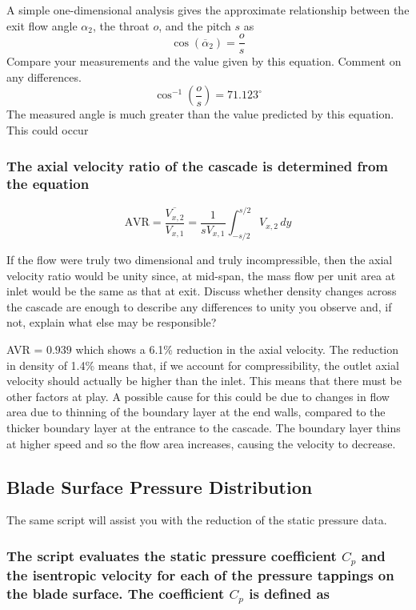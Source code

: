 \documentclass{article}
\begin{document}
A simple one-dimensional analysis gives the approximate relationship between the exit flow angle $\alpha_2$, the throat $o$, and the pitch $s$ as
\begin{equation}
    \cos (\overline{\alpha}_2) = \frac{o}{s}
\end{equation}
Compare your measurements and the value given by this equation. Comment on any
differences.
\begin{equation}
    \cos^{-1}\left( \frac{o}{s} \right) = 71.123^\circ
\end{equation}
The measured angle is much greater than the value predicted by this equation.
This could occur 

\subsubsection{The axial velocity ratio of the cascade is determined from the equation
}
\begin{equation}
    \text{AVR} = \frac{\overline{V_{x,2}}}{V_{x,1}} = \frac{1}{s V_{x,1}} \int_{-s/2}^{s/2} V_{x,2} \, dy
\end{equation}

If the flow were truly two dimensional and truly incompressible, then the axial velocity ratio
would be unity since, at mid-span, the mass flow per unit area at inlet would be the same as
that at exit. Discuss whether density changes across the cascade are enough to describe any
differences to unity you observe and, if not, explain what else may be responsible?

AVR = $0.939$ which shows a 6.1\% reduction in the axial velocity.
The reduction in density of 1.4\% means that, if we account for compressibility, the outlet axial velocity should actually be higher than the inlet.
This means that there must be other factors at play.
A possible cause for this could be due to changes in flow area due to thinning of the boundary layer at the end walls, compared to the thicker boundary layer at the entrance to the cascade.
The boundary layer thins at higher speed and so the flow area increases, causing the velocity to decrease.

\subsection{Blade Surface Pressure Distribution}

The same script will assist you with the reduction of the static pressure data.
\subsubsection{The script evaluates the static pressure coefficient $C_p$ and the isentropic velocity for
each of the pressure tappings on the blade surface. The coefficient $C_p$ is defined as}
\end{document}
